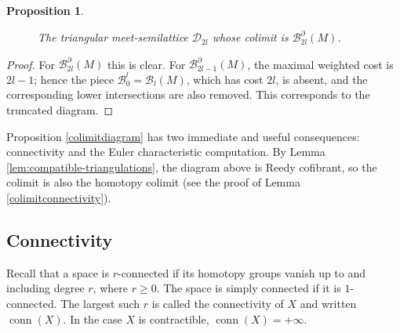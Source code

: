 \documentclass[11pt,a4paper]{article}
\numberwithin{equation}{section}
\newtheorem{prop}[thm]{Proposition}
\theoremstyle{definition}
\theoremstyle{remark}
\newcommand{\pa}{\partial}
\newcommand{\BB}{\mathcal B}
\newcommand{\conn}{\operatorname{conn}}
\begin{document}
\begin{prop}
\begin{figure}[H]
\caption{The triangular meet-semilattice $\mathcal D_{2l}$ whose colimit is $\BB_{2l}^{\pa}(M)$.}
\label{fig:triangular-filtration}
\end{figure}
\end{prop}

\begin{proof}
For \(\BB_{2l}^{\pa}(M)\) this is clear. For \(\BB_{2l-1}^{\pa}(M)\), the maximal weighted cost is \(2l-1\); hence the piece \(\BB_0^l= \BB_l(M)\), which has cost \(2l\), is absent, and the corresponding lower intersections are also removed.  This corresponds to the truncated diagram.
\end{proof}


Proposition \ref{colimitdiagram} has two immediate and useful consequences: connectivity and the Euler characteristic computation. By Lemma \ref{lem:compatible-triangulations}, the diagram above is Reedy cofibrant, so the colimit is also the homotopy colimit (see the proof of Lemma \ref{colimitconnectivity}).

\subsection{Connectivity}
\label{sec:connectivity}

Recall that a space is \(r\)-connected if its homotopy groups vanish up to and including degree $r$, where $r\geq 0$. The space is simply connected if it is $1$-connected. The largest such $r$ is called the connectivity of $X$ and written $\operatorname{conn}(X)$. In the case $X$ is contractible, $\conn (X)=+\infty$.
\end{document}
